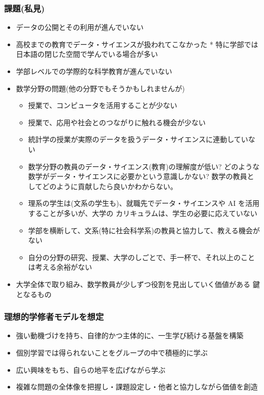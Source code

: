 \documentclass[
]{book}
\providecommand{\tightlist}{%
  \setlength{\itemsep}{0pt}\setlength{\parskip}{0pt}}
\theoremstyle{definition}
\theoremstyle{definition}
\theoremstyle{definition}
\theoremstyle{definition}
\theoremstyle{remark}
\begin{document}
\hypertarget{ux8ab2ux984cux79c1ux898b}{%
\subsubsection{課題(私見)}\label{ux8ab2ux984cux79c1ux898b}}

\begin{itemize}
\item
  データの公開とその利用が進んでいない
\item
  高校までの教育でデータ・サイエンスが扱われてこなかった * 特に学部では日本語の閉じた空間で学んでいる場合が多い
\item
  学部レベルでの学際的な科学教育が進んでいない
\item
  数学分野の問題(他の分野でもそうかもしれませんが)

  \begin{itemize}
  \tightlist
  \item
    授業で、コンピュータを活用することが少ない
  \item
    授業で、応用や社会とのつながりに触れる機会が少ない
  \item
    統計学の授業が実際のデータを扱うデータ・サイエンスに連動していない
  \item
    数学分野の教員のデータ・サイエンス(教育)の理解度が低い?
    どのような数学がデータ・サイエンスに必要かという意識しかない?
    数学の教員としてどのように貢献したら良いかわからない。
  \item
    理系の学生は(文系の学生も)、就職先でデータ・サイエンスや AI を活用することが多いが、大学の カリキュラムは、学生の必要に応えていない
  \item
    学部を横断して、文系(特に社会科学系)の教員と協力して、教える機会がない
  \item
    自分の分野の研究、授業、大学のしごとで、手一杯で、それ以上のことは考える余裕がない
  \end{itemize}
\item
  大学全体で取り組み、数学教員が少しずつ役割を見出していく価値がある 鍵となるもの
\end{itemize}

\hypertarget{ux7406ux60f3ux7684ux5b66ux4feeux8005ux30e2ux30c7ux30ebux3092ux60f3ux5b9a}{%
\subsubsection{理想的学修者モデルを想定}\label{ux7406ux60f3ux7684ux5b66ux4feeux8005ux30e2ux30c7ux30ebux3092ux60f3ux5b9a}}

\begin{itemize}
\tightlist
\item
  強い動機づけを持ち、自律的かつ主体的に、一生学び続ける基盤を構築
\item
  個別学習では得られないことをグループの中で積極的に学ぶ
\item
  広い興味をもち、自らの地平を広げながら学ぶ
\item
  複雑な問題の全体像を把握し・課題設定し・他者と協力しながら価値を創造
\end{itemize}
\end{document}
